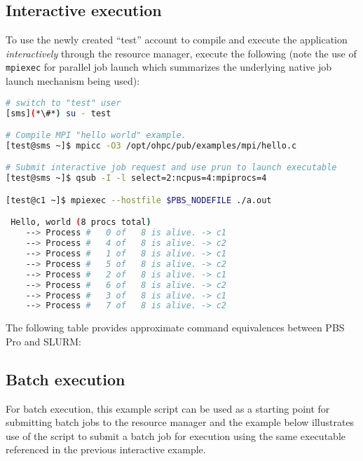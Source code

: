 \subsection{Interactive execution}
To use the newly created ``test'' account to compile and execute the
application {\em interactively} through the resource manager, execute the
following (note the use of \texttt{mpiexec} for parallel job launch which summarizes
the underlying native job launch mechanism being used):

\begin{lstlisting}[language=bash,keywords={}]
# switch to "test" user
[sms](*\#*) su - test

# Compile MPI "hello world" example. 
[test@sms ~]$ mpicc -O3 /opt/ohpc/pub/examples/mpi/hello.c

# Submit interactive job request and use prun to launch executable
[test@sms ~]$ qsub -I -l select=2:ncpus=4:mpiprocs=4

[test@c1 ~]$ mpiexec --hostfile $PBS_NODEFILE ./a.out

 Hello, world (8 procs total)
    --> Process #   0 of   8 is alive. -> c1
    --> Process #   4 of   8 is alive. -> c2
    --> Process #   1 of   8 is alive. -> c1
    --> Process #   5 of   8 is alive. -> c2
    --> Process #   2 of   8 is alive. -> c1
    --> Process #   6 of   8 is alive. -> c2
    --> Process #   3 of   8 is alive. -> c1
    --> Process #   7 of   8 is alive. -> c2
\end{lstlisting}


\begin{center}
\begin{tcolorbox}[]
The following table provides approximate command equivalences between PBS Pro
and SLURM:

\vspace*{0.15cm}

\end{tcolorbox}
\end{center}

\subsection{Batch execution}

For batch execution, this example script can be used as a starting point for 
submitting batch jobs to the resource manager and the example below illustrates
use of the script to submit a batch job for execution using the same executable 
referenced in the previous interactive example.

